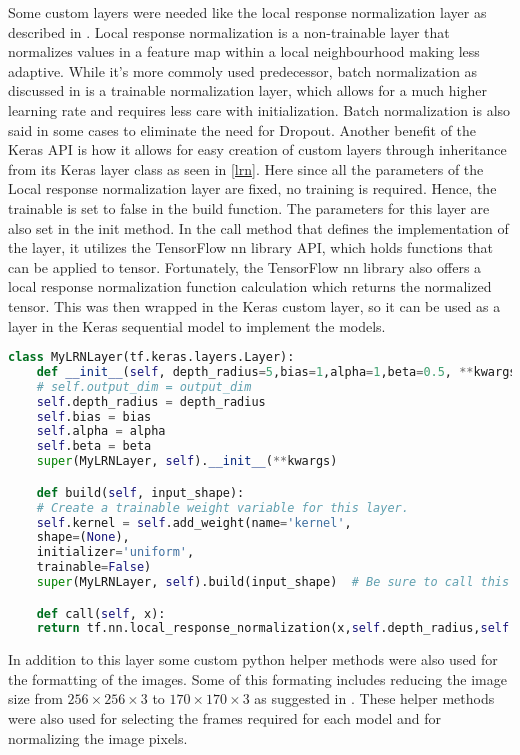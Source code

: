 Some custom layers were needed like the local response normalization layer as described in \citep{NIPS2012_4824}.
Local response normalization is a non-trainable layer that normalizes values in a feature map within a local neighbourhood making less adaptive.
While it's more commoly used predecessor, batch normalization as discussed in \citep{ioffe2015batch} is a trainable normalization layer, which allows for a much higher learning rate and requires less care with initialization.
Batch normalization is also said in some cases to eliminate the need for Dropout.
Another benefit of the Keras API is how it allows for easy creation of custom layers through inheritance from its Keras layer class as seen in \ref{lrn}.
Here since all the parameters of the Local response normalization layer are fixed, no training is required. Hence, the trainable is set to false in the build function. The parameters for this layer are also set in the init method.
In the call method that defines the implementation of the layer, it utilizes the TensorFlow nn library API, which holds functions that can be applied to tensor.
Fortunately, the TensorFlow nn library also offers a local response normalization function calculation which returns the normalized tensor. This was then wrapped in the Keras custom layer,  so it can be used as a layer in the Keras sequential model to implement the models.

\begin{lstlisting}[language=Python, caption=Local response normalization layer implemetation, label=lrn]
    class MyLRNLayer(tf.keras.layers.Layer):
    def __init__(self, depth_radius=5,bias=1,alpha=1,beta=0.5, **kwargs):
    # self.output_dim = output_dim
    self.depth_radius = depth_radius
    self.bias = bias
    self.alpha = alpha
    self.beta = beta
    super(MyLRNLayer, self).__init__(**kwargs)

    def build(self, input_shape):
    # Create a trainable weight variable for this layer.
    self.kernel = self.add_weight(name='kernel',
    shape=(None),
    initializer='uniform',
    trainable=False)
    super(MyLRNLayer, self).build(input_shape)  # Be sure to call this at the end

    def call(self, x):
    return tf.nn.local_response_normalization(x,self.depth_radius,self.bias,self.alpha,self.beta)
\end{lstlisting}

In addition to this layer some custom python helper methods were also used for the formatting of the images. Some of this formating includes reducing the image size from $256 \times 256 \times 3$ to $170 \times170 \times 3$ as suggested in \citep{KarpathyCVPR14}.
These helper methods were also used for selecting the frames required for each model and for normalizing the image pixels.


